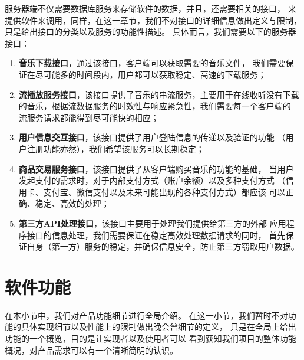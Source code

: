 服务器端不仅需要数据库服务来存储软件的数据，并且，还需要相关的接口，
    来提供软件来调用，同样，在这一章节，我们不对接口的详细信息做出定义与限制，
    只是给出接口的分类以及服务的功能性描述。
具体而言，我们需要以下的服务器接口：
\begin{enumerate}
    \item \textbf{音乐下载接口}，通过该接口，客户端可以获取需要的音乐文件，
        我们需要保证在尽可能多的时间段内，用户都可以获取稳定、高速的下载服务；
    \item \textbf{流播放服务接口}，该接口提供了音乐的串流服务，主要用于在线收听没有下载
        的音乐，根据流数据服务的时效性与响应紧急性，我们需要每一个客户端的
        流服务请求都能得到尽可能快的相应；
    \item \textbf{用户信息交互接口}，该接口提供了用户登陆信息的传递以及验证的功能
        （用户注册功能亦然），我们希望该服务可以长期稳定；
    \item \textbf{商品交易服务接口}，该接口提供了从客户端购买音乐的功能的基础，
        当用户发起支付的需求时，对于内部支付方式（账户余额）以及多种支付方式
        （信用卡、支付宝、微信支付以及未来可能出现的各种支付方式）都应该
        可以正确、稳定、高效的处理；
    \item \textbf{第三方API处理接口}，该接口主要用于处理我们提供给第三方的外部
        应用程序接口的信息处理，我们需要保证在稳定高效处理数据请求的同时，
        首先保证自身（第一方）服务的稳定，并确保信息安全，防止第三方窃取用户数据。
\end{enumerate}

\section{软件功能}

在本小节中，我们对\proname 产品功能细节进行全局介绍。
在这一小节，我们暂时不对功能的具体实现细节以及性能上的限制做出晚会曾细节的定义，
    只是在全局上给出功能的一个概览，目的是让实现者以及使用者可以
    看到获知我们项目的整体功能概况，对产品需求可以有一个清晰简明的认识。

